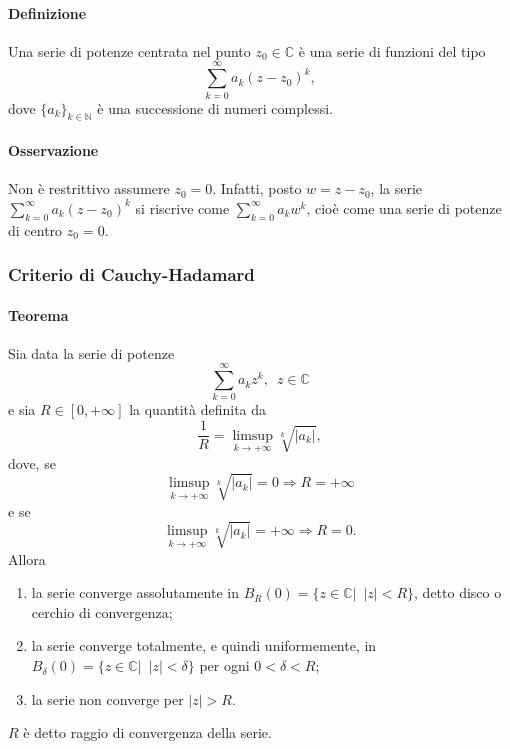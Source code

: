 \documentclass{article}
\newcommand{\C}{\mathbb{C}}
\newcommand{\N}{\mathbb{N}}
\begin{document}
\paragraph{{Definizione}}
Una serie di potenze centrata nel punto $z_0 \in \C$ è una serie di funzioni del tipo 
\begin{equation*}
    \sum_{k=0}^{\infty} a_k(z-z_0)^k,
\end{equation*}
dove $\{a_k\}_{k\in\N}$ è una successione di numeri complessi.


\paragraph{{Osservazione}}
Non è restrittivo assumere $z_0=0$. Infatti, posto $w=z-z_0$, la serie $\sum_{k=0}^{\infty} a_k(z-z_0)^k$ si riscrive come $\sum_{k=0}^{\infty} a_k w^k$, cioè come una serie di potenze di centro $z_0=0$.

\subsubsection{{Criterio di Cauchy-Hadamard}}
\paragraph{{Teorema}}
Sia data la serie di potenze
\begin{equation*}
    \sum_{k=0}^{\infty} a_kz^k,\,\,\, z \in \C
\end{equation*}
e sia $R\in [0,+\infty]$ la quantità definita da 
\begin{equation*}
    \frac{1}{R}=\limsup_{k \rightarrow+\infty} \sqrt[k]{|a_k|},
\end{equation*}
dove, se
\begin{equation*}
    \limsup_{k \rightarrow+\infty} \sqrt[k]{|a_k|} =0 \Rightarrow R=+\infty
\end{equation*}
e se
\begin{equation*}
    \limsup_{k \rightarrow+\infty} \sqrt[k]{|a_k|} =+\infty \Rightarrow R=0.
\end{equation*}
Allora
\begin{enumerate}
    \item la serie converge assolutamente in $B_R(0)=\{z\in\C|\,\,\,|z|<R\}$, detto disco o cerchio di convergenza;
    \item la serie converge totalmente, e quindi uniformemente, in $B_\delta (0)=\{z \in \C|\,\,\,|z|< \delta\}$ per ogni $0< \delta < R$;
    \item la serie non converge per $|z|>R$.
\end{enumerate}
$R$ è detto raggio di convergenza della serie.
\end{document}
